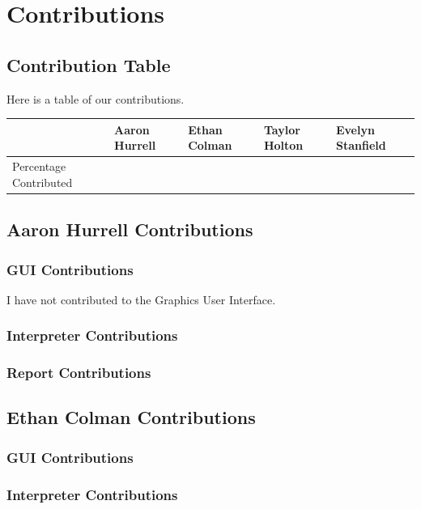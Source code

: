 \documentclass[a4paper, oneside, 11pt]{report}
\begin{document}
    
    


    \appendix
    \chapter{Contributions}
    \section{Contribution Table}
    Here is a table of our contributions. \\

    \begin{table}[h]
        \begin{tabular}{|l|l|l|l|l|}
            \hline
            & Aaron Hurrell & Ethan Colman & Taylor Holton & Evelyn Stanfield \\ \hline
            Percentage Contributed &               &              &               &                  \\ \hline
        \end{tabular}
    \end{table}

    \section{Aaron Hurrell Contributions}
    \subsection{GUI Contributions}
    I have not contributed to the Graphics User Interface.
    \subsection{Interpreter Contributions}
    \subsection{Report Contributions}

    \section{Ethan Colman Contributions}
    \subsection{GUI Contributions}
    \subsection{Interpreter Contributions}
\end{document}
